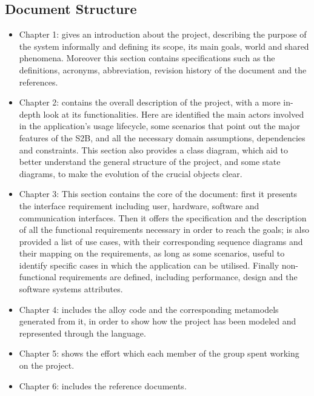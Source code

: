 \subsection{Document Structure}
\begin{itemize}
	\item Chapter 1: gives an introduction about the project, describing the purpose of the    system informally and defining its scope, its main goals, world and shared phenomena. Moreover this section contains specifications such as the definitions, acronyms, abbreviation,	revision history of the document and the references.
	\item Chapter 2: contains the overall description of the project, with a more in-depth look at its functionalities. Here are identified the main actors involved in the application’s usage lifecycle, some scenarios that point out the major features of the S2B, and all the necessary domain assumptions, dependencies and constraints. This section also provides a class diagram, which aid to better understand the general structure of the project, and some state diagrams, to make the evolution of the crucial objects clear.
	\item Chapter 3: This section contains the core of the document: first it presents the interface requirement including user, hardware, software and communication interfaces.
	Then it offers the specification and the description of all the functional requirements necessary in order to reach the goals; is also provided a list of use cases, with their corresponding sequence diagrams and their mapping on the requirements, as long as some scenarios, useful to identify specific cases in which the application can be utilised.
	Finally non-functional requirements are defined, including performance, design and the software systems attributes.
	\item Chapter 4: includes the alloy code and the corresponding metamodels generated from it, in order to show how the project has been modeled and represented through the language.   
	\item Chapter 5: shows the effort which each member of the group spent working on the project.
	\item Chapter 6: includes the reference documents.
\end{itemize}

